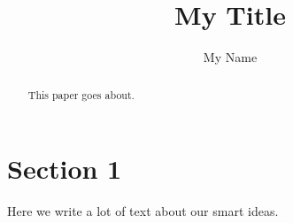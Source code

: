 \documentclass{article}
\begin{document}
\title{My Title}
\author{My Name}
\maketitle

\begin{abstract}
This paper goes about.
\end{abstract}

\section{Section 1}
Here we write a lot of text about our smart ideas.
\cite{Eckert2007}



\end{document}
